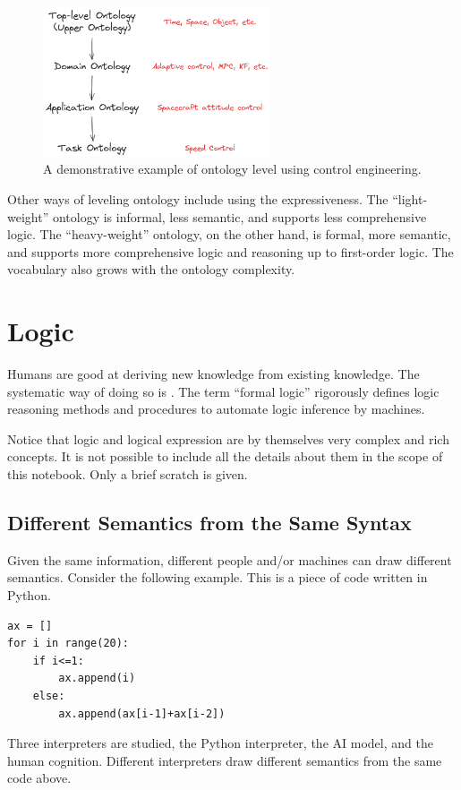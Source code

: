 \begin{figure}[htbp]
	\centering
	\includegraphics[width=0.6\textwidth]{chapters/part-4/figures/ontologylevel.png}
	\caption{A demonstrative example of ontology level using control engineering.}
	\label{fig:ontologylevel}
\end{figure}

Other ways of leveling ontology include using the expressiveness. The ``light-weight'' ontology is informal, less semantic, and supports less comprehensive logic. The ``heavy-weight'' ontology, on the other hand, is formal, more semantic, and supports more comprehensive logic and reasoning up to first-order logic. The vocabulary also grows with the ontology complexity.

\section{Logic} \label{sec:logic}

Humans are good at deriving new knowledge from existing knowledge. The systematic way of doing so is . The term ``formal logic'' rigorously defines logic reasoning methods and procedures to automate logic inference by machines.

Notice that logic and logical expression are by themselves very complex and rich concepts. It is not possible to include all the details about them in the scope of this notebook. Only a brief scratch is given.

\subsection{Different Semantics from the Same Syntax}

Given the same information, different people and/or machines can draw different semantics. Consider the following example. This is a piece of code written in Python.
\begin{lstlisting}
ax = []
for i in range(20):
	if i<=1:
		ax.append(i)
	else:
		ax.append(ax[i-1]+ax[i-2])
\end{lstlisting}
Three interpreters are studied, the Python interpreter, the AI model, and the human cognition. Different interpreters draw different semantics from the same code above.

